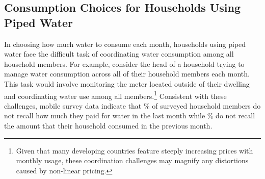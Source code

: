\documentclass[12pt]{article}
\begin{document}
\subsection{Consumption Choices for Households Using Piped Water}\label{section:consumptionchoice}





In choosing how much water to consume each month, households using piped water face the difficult task of coordinating water consumption among all household members.  For example, consider the head of a household trying to manage water consumption across all of their household members each month.  This task would involve monitoring the meter located outside of their dwelling and coordinating water use among all members.\footnote{Given that many developing countries feature steeply increasing prices with monthly usage, these coordination challenges may magnify any distortions caused by non-linear pricing.}  Consistent with these challenges, mobile survey data indicate that \unskip\% of surveyed household members do not recall how much they paid for water in the last month while \unskip\% do not recall the amount that their household consumed in the previous month.
\end{document}

